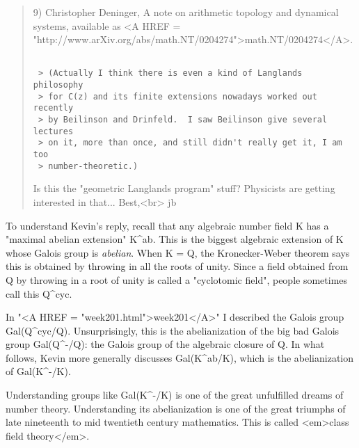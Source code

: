 \begin{quote}
9) Christopher Deninger, 
A note on arithmetic topology and dynamical systems,
available as <A HREF = "http://www.arXiv.org/abs/math.NT/0204274">math.NT/0204274</A>.


\begin{verbatim}

 > (Actually I think there is even a kind of Langlands philosophy 
 > for C(z) and its finite extensions nowadays worked out recently 
 > by Beilinson and Drinfeld.  I saw Beilinson give several lectures 
 > on it, more than once, and still didn't really get it, I am too 
 > number-theoretic.)
\end{verbatim}
    

 Is this the "geometric Langlands program" stuff?  Physicists are
 getting interested in that... 
 Best,<br>
 jb
\end{quote}

To understand Kevin's reply, recall that
any algebraic number field K has a "maximal abelian extension"
K^{ab}.  This is the
biggest algebraic extension of K whose Galois group is
\emph{abelian}.  When K = Q, the Kronecker-Weber theorem says
this is obtained by throwing in all the roots of unity.
Since a field obtained from Q by throwing in a root of unity is called
a "cyclotomic field", people sometimes call this Q^{cyc}.

In "<A HREF = "week201.html">week201</A>" I described
the Galois group Gal(Q^{cyc}/Q).  Unsurprisingly,
this is the abelianization
of the big bad Galois group Gal(Q^{-}/Q): the Galois group
of the algebraic closure of Q.    In what follows,
Kevin more generally discusses Gal(K^{ab}/K), which is
the abelianization of Gal(K^{-}/K).  

Understanding groups like Gal(K^{-}/K)
is one of the great unfulfilled dreams of number theory.  Understanding
its abelianization is one of the great triumphs of late nineteenth
to mid twentieth century mathematics.  This is called <em>class field
theory</em>.

